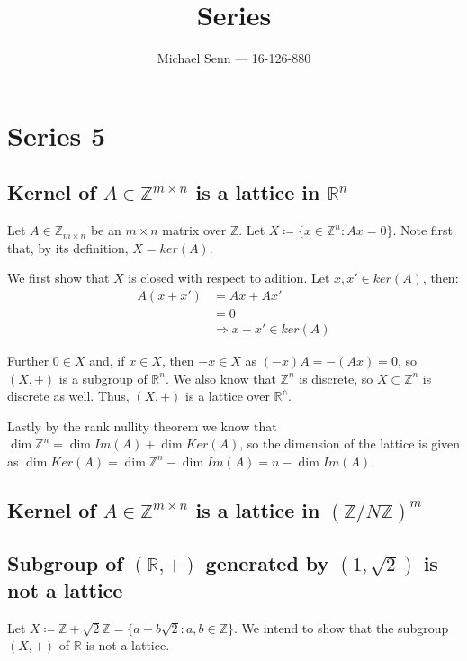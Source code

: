 \documentclass[a4paper]{scrreprt}
\title{Series \series}
\author{Michael Senn \maillink{michael.senn@students.unibe.ch} --- 16-126-880}
\date{\printdate}
\newcommand{\series}{5}
\begin{document}
\maketitle


\setcounter{chapter}{\numexpr \series - 1 \relax}

\chapter{Series \series}

\section{Kernel of $A \in \mathbb{Z}^{m \times n}$ is a lattice in $\mathbb{R}^n$}

Let $A \in \mathbb{Z}_{m \times n}$ be an $m \times n$ matrix over
$\mathbb{Z}$. Let $X \coloneqq \{x \in \mathbb{Z}^n : Ax = 0\}$. Note first
that, by its definition, $X = ker(A)$.

We first show that $X$ is closed with respect to adition. Let $x, x' \in
ker(A)$, then:
\begin{align*}
		A(x + x') & = Ax + Ax' \\
				  & = 0 \\
				  & \Rightarrow x + x' \in ker(A)
\end{align*}

Further $0 \in X$ and, if $x \in X$, then $-x \in X$ as $(-x)A = -(Ax) = 0$, so
$(X, +)$ is a subgroup of $\mathbb{R}^n$. We also know that $\mathbb{Z}^n$ is
discrete, so $X \subset \mathbb{Z}^n$ is discrete as well. Thus, $(X, +)$ is a
lattice over $\mathbb{R^n}$.

Lastly by the rank nullity theorem we know that $\dim \mathbb{Z}^n = \dim Im(A)
+ \dim Ker(A)$, so the dimension of the lattice is given as $\dim Ker(A) = \dim
\mathbb{Z}^n - \dim Im(A) = n - \dim Im(A)$.

\section{Kernel of $A \in \mathbb{Z}^{m \times n}$ is a lattice in $(\mathbb{Z} / N\mathbb{Z})^m$}

\section{Subgroup of $(\mathbb{R}, +)$ generated by $(1, \sqrt{2})$ is not a lattice}

Let $X \coloneqq \mathbb{Z} + \sqrt{2} \mathbb{Z} = \{a + b \sqrt{2} : a, b \in
\mathbb{Z}\}$. We intend to show that the subgroup $(X, +)$ of $\mathbb{R}$ is
not a lattice.
\end{document}

